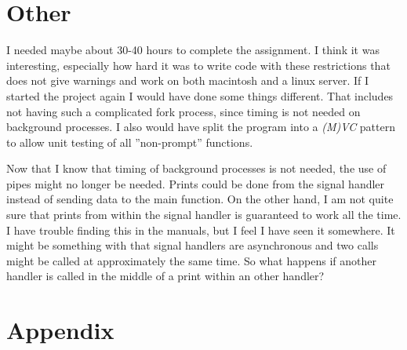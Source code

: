 \documentclass{article}
\begin{document}
\section{Other}
    I needed maybe about 30-40 hours to complete the assignment. I think it was
    interesting, especially how hard it was to write code with these restrictions
    that does not give warnings and work on both macintosh and a linux server.
    If I started the project again I would have done some things different. That
    includes not having such a complicated fork process, since timing is not needed
    on background processes. I also would have split the program into a \emph{(M)VC}
    pattern to allow unit testing of all ''non-prompt'' functions.

    Now that I know that timing of background processes is not needed,
    the use of pipes might no longer be needed. Prints could be done from
    the signal handler instead of sending data to the main function. On the
    other hand, I am not quite sure that prints from within the signal handler
    is guaranteed to work all the time. I have trouble finding this in the
    manuals, but I feel I have seen it somewhere. It might be something with
    that signal handlers are asynchronous and two calls might be called at
    approximately the same time. So what happens if another handler is called
    in the middle of a print within an other handler?

\newpage
\section{Appendix}
    
    
    
\end{document}
